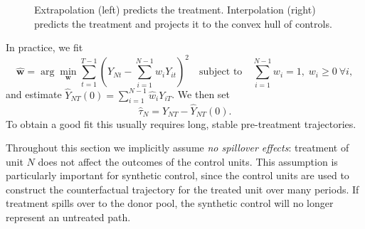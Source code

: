 \documentclass[11pt]{exam}
\begin{document}
\begin{figure}[htbp]
  \caption{Extrapolation (left) predicts the treatment. Interpolation (right) predicts the treatment and projects it to the convex hull of controls.} \label{fig:extrapolation_interpolation}
\end{figure}

In practice, we fit
\begin{equation}\label{eq:sc_opt_scalar}
  \hat{\mathbf w}
  =
  \arg\min_{\mathbf w}
  \sum_{t=1}^{T-1}
  \left(
    Y_{Nt} - \sum_{i=1}^{N-1} w_i Y_{it}
  \right)^{2}
  \quad\text{subject to}\quad
  \sum_{i=1}^{N-1} w_i = 1,\; w_i \ge 0 \ \forall i,
\end{equation}
and estimate $\widehat Y_{NT}(0) = \sum_{i=1}^{N-1} \hat w_i Y_{iT}$. We then set 
\[
    \hat \tau_N = Y_{NT} - \widehat Y_{NT}(0).
\]
To obtain a good fit this usually requires long, stable pre-treatment trajectories.

\begin{remark}
  Throughout this section we implicitly assume \emph{no spillover effects}:
  treatment of unit $N$ does not affect the outcomes of the control units.
  This assumption is particularly important for synthetic control, since the
  control units are used to construct the counterfactual trajectory for the
  treated unit over many periods. If treatment spills over to the donor pool,
  the synthetic control will no longer represent an untreated path.
\end{remark}
\end{document}
